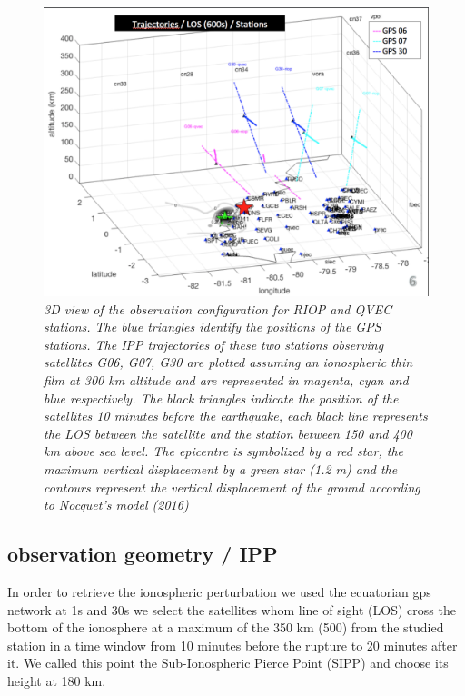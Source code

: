 \documentclass{gji}
\begin{document}
\begin{figure}
\begin{center}
\includegraphics[width=1\linewidth]{images/situation_map_3D.png}
\end{center}
\caption{ \textit{\emph{3D view of the observation configuration for RIOP and QVEC stations}. The blue triangles identify the positions of the GPS stations. The IPP trajectories of these two stations observing satellites G06, G07, G30 are plotted assuming an ionospheric thin film at 300 km altitude and are represented in magenta, cyan and blue respectively. The black triangles indicate the position of the satellites 10 minutes before the earthquake, each black line represents the LOS between the satellite and the station between 150 and 400 km above sea level. The epicentre is symbolized by a red star, the maximum vertical displacement by a green star (1.2 m) and the contours represent the vertical displacement of the ground according to Nocquet's model (2016)}} 

\label{superplot3D}
\end{figure}


	\subsection{observation geometry / IPP}
	In order to retrieve the ionospheric perturbation we used the ecuatorian gps network at 1s and 30s  we select the satellites whom line of sight (LOS) cross the bottom of the ionosphere at a maximum of the 350 km (500) from the studied station in a time window from 10 minutes before the rupture to 20 minutes after it. We called this point the Sub-Ionospheric Pierce Point (SIPP) and choose its height at 180 km.
\end{document}
